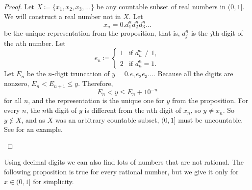 \begin{proof}
Let $X \coloneqq \{ x_1,x_2,x_3,\ldots \}$ be any countable subset of real numbers in $(0,1]$.
We will construct a real number not in $X$.  Let
\begin{equation*}
x_n = 0.d_1^nd_2^nd_3^n\ldots
\end{equation*}
be the unique representation from the proposition, that is, $d_j^n$ is the
$j$th digit of the $n$th number.  Let
\begin{equation*}
e_n \coloneqq
\begin{cases}
1 & \text{if } d_n^n \neq 1, \\
2 & \text{if } d_n^n = 1.
\end{cases}
\end{equation*}
Let $E_n$ be the $n$-digit truncation of $y = 0.e_1e_2e_3\ldots$.  Because
all the digits are nonzero, $E_n < E_{n+1} \leq y$.  Therefore,
\begin{equation*}
E_n < y \leq E_n + {10}^{-n}
\end{equation*}
for all $n$, and the representation is the unique one for $y$ from
the proposition.  For every $n$, the $n$th digit
of $y$ is different from the $n$th digit of $x_n$, so $y \neq x_n$.
So $y \notin X$, and as $X$ was an arbitrary countable subset,
$(0,1]$ must be uncountable.  See  for an
example.
\begin{myfigureht}
\caption{Example of Cantor diagonalization, the diagonal digits $d_n^n$
marked.\label{cantorexamplefig}}
\end{myfigureht}
\end{proof}

Using decimal digits we can also find lots of numbers that are not rational.
The following proposition is true for every
rational number, but we give it only for $x \in (0,1]$ for simplicity.

